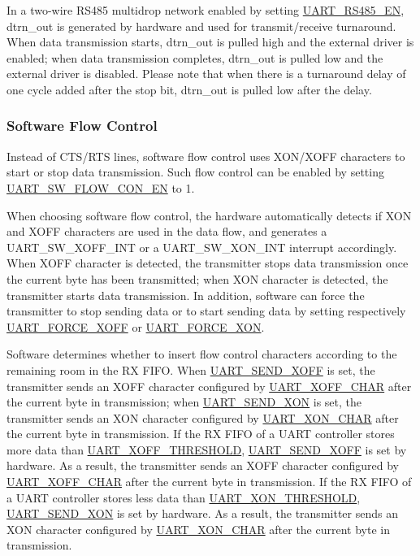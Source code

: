 \documentclass[main\_\_EN.tex]{subfiles}
\begin{document}
In a two-wire RS485 multidrop network enabled by setting \hyperref[fielddesc:UARTRS485EN]{UART\_RS485\_EN}, dtrn\_out is generated by hardware and used for transmit/receive turnaround. When data transmission starts, dtrn\_out is pulled high and the external driver is enabled; when data transmission completes, dtrn\_out is pulled low and the external driver is disabled. Please note that when there is a turnaround delay of one cycle added after the stop bit, dtrn\_out is pulled low after the delay.



\subsubsection{Software Flow Control}

Instead of CTS/RTS lines, software flow control uses XON/XOFF characters to start or stop data transmission. Such flow control can be enabled by setting \hyperref[fielddesc:UARTSWFLOWCONEN]{UART\_SW\_FLOW\_CON\_EN} to 1.

When choosing software flow control, the hardware automatically detects if XON and XOFF characters are used in the data flow, and generates a UART\_SW\_XOFF\_INT or a UART\_SW\_XON\_INT interrupt accordingly. When XOFF character is detected, the transmitter stops data transmission once the current byte has been transmitted; when XON character is detected, the transmitter starts data transmission. In addition, software can force the transmitter to stop sending data or to start sending data by setting respectively \hyperref[fielddesc:UARTFORCEXOFF]{UART\_FORCE\_XOFF} or \hyperref[fielddesc:UARTFORCEXON]{UART\_FORCE\_XON}.

Software determines whether to insert flow control characters according to the remaining room in the RX FIFO. When \hyperref[fielddesc:UARTSENDXOFF]{UART\_SEND\_XOFF} is set, the transmitter sends an XOFF character configured by \hyperref[fielddesc:UARTXOFFCHAR]{UART\_XOFF\_CHAR} after the current byte in transmission; when \hyperref[fielddesc:UARTSENDXON]{UART\_SEND\_XON} is set, the transmitter sends an XON character configured by \hyperref[fielddesc:UARTXONCHAR]{UART\_XON\_CHAR} after the current byte in transmission. If the RX FIFO of a UART controller stores more data than \hyperref[fielddesc:UARTXOFFTHRESHOLD]{UART\_XOFF\_THRESHOLD}, \hyperref[fielddesc:UARTSENDXOFF]{UART\_SEND\_XOFF} is set by hardware. As a result, the transmitter sends an XOFF character configured by \hyperref[fielddesc:UARTXOFFCHAR]{UART\_XOFF\_CHAR} after the current byte in transmission. If the RX FIFO of a UART controller stores less data than \hyperref[fielddesc:UARTXONTHRESHOLD]{UART\_XON\_THRESHOLD}, \hyperref[fielddesc:UARTSENDXON]{UART\_SEND\_XON} is set by hardware. As a result, the transmitter sends an XON character configured by \hyperref[fielddesc:UARTXONCHAR]{UART\_XON\_CHAR} after the current byte in transmission.
\end{document}
